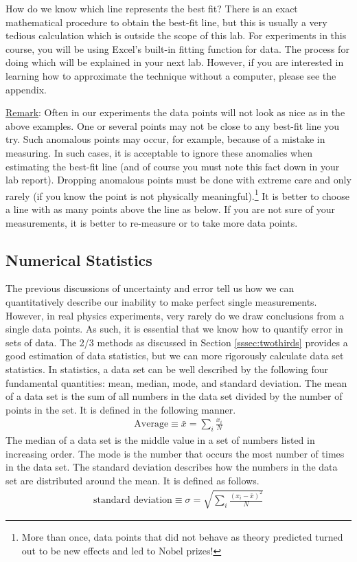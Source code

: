 How do we know which line represents the best fit? There is an exact mathematical procedure to obtain the best-fit line, but this is usually a very tedious calculation which is outside the scope of this lab. For experiments in this course, you will be using Excel's built-in fitting function for data. The process for doing which will be explained in your next lab. However, if you are interested in learning how to approximate the technique without a computer, please see the appendix.\myskip

\underline{Remark}: Often in our experiments the data points will not look as nice as in the above examples. One or several points may not be close to any best-fit line you try. Such anomalous points may occur, for example, because of a mistake in measuring. In such cases, it is acceptable to ignore these anomalies when estimating the best-fit line (and of course you must note this fact down in your lab report).  Dropping anomalous points must be done with extreme care and only rarely (if you know the point is not physically meaningful).\footnote{More than once, data points that did not behave as theory predicted turned out to be new effects and led to Nobel prizes!}  It is better to choose a line with as many points above the line as below. If you are not sure of your measurements, it is better to re-measure or to take more data points. \myskip

\subsection{Numerical Statistics}
The previous discussions of uncertainty and error tell us how we can quantitatively describe our inability to make perfect single measurements. However, in real physics experiments, very rarely do we draw conclusions from a single data points. As such, it is essential that we know how to quantify error in sets of data. The 2/3 methods as discussed in Section \ref{sssec:twothirds} provides a good estimation of data statistics, but we can more rigorously calculate data set statistics. In statistics, a data set can be well described by the following four fundamental quantities: mean, median, mode, and standard deviation. The mean of a data set is the sum of all numbers in the data set divided by the number of points in the set. It is defined in the following manner.
\begin{gather}
 \text{Average} \equiv \bar x= \sum_{i} \frac{x_i}{N}
\end{gather}
The median of a data set is the middle value in a set of numbers listed in increasing order. The mode is the number that occurs the most number of times in the data set. The standard deviation describes  how the numbers in the data set are distributed around the mean. It is defined as follows.
\begin{gather}
\text{standard deviation} \equiv \sigma = \sqrt{\sum_i \frac{(x_i - \bar x)^2}{N}}
\end{gather}

